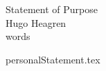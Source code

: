 \documentclass[12pt]{article}
\title{}
\author{}
\date{}
\newcommand\wordcount{words}
\begin{document}
 
\begin{center}
\LARGE{}Statement of Purpose\\
\large Hugo Heagren\\
\wordcount{}
\end{center}
{personalStatement.tex}
\end{document}

